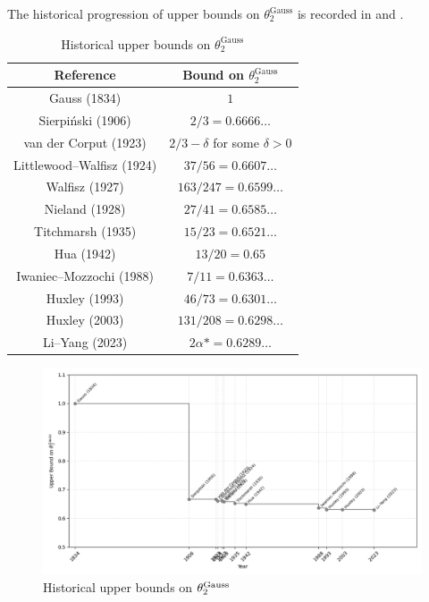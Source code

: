 The historical progression of upper bounds on $\theta_2^{\operatorname{Gauss}}$ is recorded in  and .


\begin{table}[ht]
    \def\arraystretch{1.2}
    \centering
    \caption{Historical upper bounds on $\theta_2^{\operatorname{Gauss}}$}
    \begin{tabular}{|c|c|}
    \hline
    Reference & Bound on $\theta_2^{\operatorname{Gauss}}$\\
    \hline
    Gauss (1834) & $1$\\
    \hline
    Sierpi\'nski (1906) \cite{sierpinski_pewnem_1906} & $2/3 = 0.6666\ldots$\\
    \hline
    van der Corput (1923) \cite{van_der_corput_neue_1923} & $2/3 - \delta$ for some $\delta > 0$\\
    \hline
    Littlewood--Walfisz (1924) \cite{littlewood_lattice_1924} & $37/56 = 0.6607\ldots$\\
    \hline
    Walfisz (1927) \cite{walfisz_teilerprobleme_1927} & $163/247 = 0.6599\ldots$\\
    \hline
    Nieland (1928) \cite{nieland_zum_1928} & $27/41 = 0.6585\ldots$\\
    \hline
    Titchmarsh (1935) \cite{titchmarsh_lattice_points_1935} & $15/23 = 0.6521\ldots$\\
    \hline
    Hua (1942) \cite{hua_lattice_points_1942} & $13/20 = 0.65$\\
    \hline
    Iwaniec--Mozzochi (1988) \cite{iwaniec_divisor_1988} & $7/11 = 0.6363\ldots$ \\
    \hline
    Huxley (1993) \cite{huxley_lattice_1993} & $46/73 = 0.6301\ldots$\\
    \hline
    Huxley (2003) \cite{huxley_exponential_2003} & $131/208 = 0.6298\ldots$\\
    \hline
    Li--Yang (2023) \cite{li_yang_gauss_2024} & $2\alpha* = 0.6289\ldots$\\
    \hline 
    \end{tabular}
\label{gauss-circle-table-2}
\end{table}

\begin{figure}
    \centering
    \includegraphics[width=0.5\linewidth]{chapter/gauss_circle_historical_bounds.png}
    \caption{Historical upper bounds on $\theta_2^{\rm Gauss}$}
    \label{fig:gauss_circle_historical}
\end{figure}